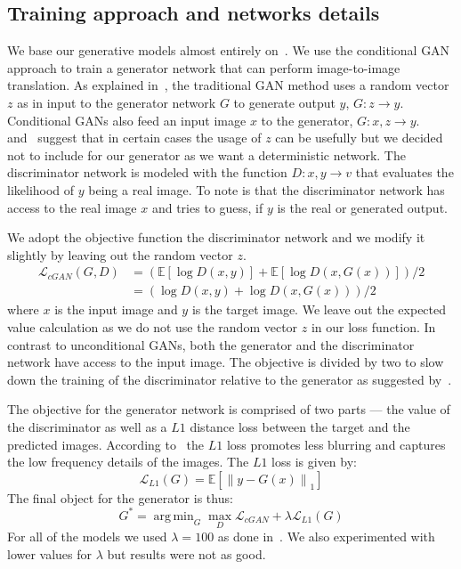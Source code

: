 \documentclass{llncs}
\DeclareMathOperator*{\argminA}{arg\,min}
\begin{document}
\subsection{Training approach and networks details}
We base our generative models almost entirely on~\cite{pix2pix}. We use the conditional GAN approach to train a generator network that can perform image-to-image translation. As explained in~\cite{pix2pix}, the traditional GAN method uses a random vector $z$ as in input to the generator network $G$ to generate output $y$, $G:z \rightarrow y$. Conditional GANs also feed an input image $x$ to the generator, $G: x,z \rightarrow y$.~\cite{pix2pix} and~\cite{wang2016} suggest that in certain cases the usage of $z$ can be usefully but we decided not to include for our generator as we want a deterministic network. The discriminator network is modeled with the function $D:x,y \rightarrow v$ that evaluates the likelihood of $y$ being a real image. To note is that the discriminator network has access to the real image $x$ and tries to guess, if $y$ is the real or generated output.

We adopt the objective function the discriminator network and we modify it slightly by leaving out the random vector $z$.
\begin{equation}
  \begin{split}
    \mathcal{L}_{cGAN} (G, D) &= (\mathbb{E}[\log D (x,y)] + \mathbb{E}[\log D (x, G(x))])/2 \\
    &= (\log D (x,y) + \log D (x, G(x)))/2
  \end{split}
\end{equation}
where $x$ is the input image and $y$ is the target image. We leave out the expected value calculation as we do not use the random vector $z$ in our loss function. In contrast to unconditional GANs, both the generator and the discriminator network have access to the input image. The objective is divided by two to slow down the training of the discriminator relative to the generator as suggested by~\cite{pix2pix}.

The objective for the generator network is comprised of two parts --- the value of the discriminator as well as a $L1$ distance loss between the target and the predicted images. According to~\cite{pix2pix} the $L1$ loss promotes less blurring and captures the low frequency details of the images. The $L1$ loss is given by:
\begin{equation}
\mathcal{L}_{L1} (G) = \mathbb{E}[\left\lVert y - G(x)\right\rVert_1]
\end{equation}
The final object for the generator is thus:
\begin{equation}
G^* = \argminA_G \max_D \mathcal{L}_{cGAN}  + \lambda \mathcal{L}_{L1} (G)
\end{equation}
For all of the models we used $\lambda = 100$ as done in~\cite{pix2pix}. We also experimented with lower values for $\lambda$ but results were not as good.
\end{document}
